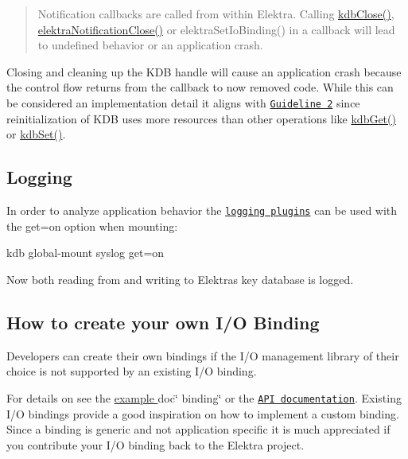 \begin{quote}
Notification callbacks are called from within Elektra. Calling {\ttfamily \hyperlink{group__kdb_gadb54dc9fda17ee07deb9444df745c96f}{kdb\+Close()}}, {\ttfamily \hyperlink{group__kdbnotification_ga5685dafbd4131011365628d6d9213594}{elektra\+Notification\+Close()}} or {\ttfamily elektra\+Set\+Io\+Binding()} in a callback will lead to undefined behavior or an application crash. \end{quote}


Closing and cleaning up the K\+DB handle will cause an application crash because the control flow returns from the callback to now removed code. While this can be considered an implementation detail it aligns with \href{#guidline-2-wait-before-reacting-to-changes}{\tt Guideline 2} since reinitialization of K\+DB uses more resources than other operations like {\ttfamily \hyperlink{group__kdb_ga28e385fd9cb7ccfe0b2f1ed2f62453a1}{kdb\+Get()}} or {\ttfamily \hyperlink{group__kdb_ga11436b058408f83d303ca5e996832bcf}{kdb\+Set()}}.

\subsection*{Logging}

In order to analyze application behavior the \href{https://www.libelektra.org/plugins/readme#notification-and-logging}{\tt logging plugins} can be used with the {\ttfamily get=on} option when mounting\+:


\begin{DoxyCode}
kdb global-mount syslog get=on
\end{DoxyCode}


Now both reading from and writing to Elektra\textquotesingle{}s key database is logged.

\subsection*{How to create your own I/O Binding}

Developers can create their own bindings if the I/O management library of their choice is not supported by an existing I/O binding.

For details on see the \hyperlink{md_src_bindings_io_doc_README_src_bindings_io_doc_README_md}{example }doc\char`\"{} binding\char`\"{} or the \href{https://doc.libelektra.org/api/current/html/group__kdbio.html}{\tt A\+PI documentation}. Existing I/O bindings provide a good inspiration on how to implement a custom binding. Since a binding is generic and not application specific it is much appreciated if you contribute your I/O binding back to the Elektra project.

